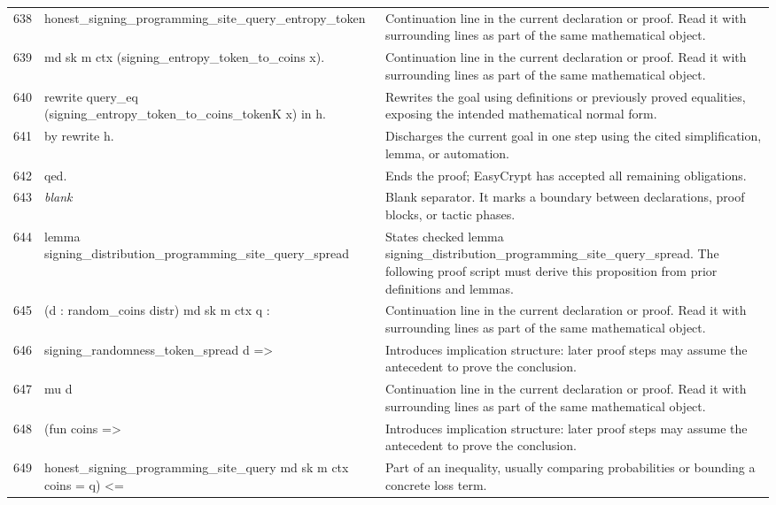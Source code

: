 \documentclass[10pt]{article}
\begin{document}
\begin{longtable}{r L{0.53\textwidth} L{0.37\textwidth}}
638 & {\ttfamily\scriptsize   honest\_signing\_programming\_site\_query\_entropy\_token} & Continuation line in the current declaration or proof.  Read it with surrounding lines as part of the same mathematical object. \\
639 & {\ttfamily\scriptsize     md sk m ctx (signing\_entropy\_token\_to\_coins x).} & Continuation line in the current declaration or proof.  Read it with surrounding lines as part of the same mathematical object. \\
640 & {\ttfamily\scriptsize rewrite query\_eq (signing\_entropy\_token\_to\_coins\_tokenK x) in h.} & Rewrites the goal using definitions or previously proved equalities, exposing the intended mathematical normal form. \\
641 & {\ttfamily\scriptsize by rewrite h.} & Discharges the current goal in one step using the cited simplification, lemma, or automation. \\
642 & {\ttfamily\scriptsize qed.} & Ends the proof; EasyCrypt has accepted all remaining obligations. \\
643 & {\ttfamily\scriptsize \emph{blank}} & Blank separator.  It marks a boundary between declarations, proof blocks, or tactic phases. \\
644 & {\ttfamily\scriptsize lemma signing\_distribution\_programming\_site\_query\_spread} & States checked lemma signing\_distribution\_programming\_site\_query\_spread.  The following proof script must derive this proposition from prior definitions and lemmas. \\
645 & {\ttfamily\scriptsize   (d : random\_coins distr) md sk m ctx q :} & Continuation line in the current declaration or proof.  Read it with surrounding lines as part of the same mathematical object. \\
646 & {\ttfamily\scriptsize   signing\_randomness\_token\_spread d =>} & Introduces implication structure: later proof steps may assume the antecedent to prove the conclusion. \\
647 & {\ttfamily\scriptsize   mu d} & Continuation line in the current declaration or proof.  Read it with surrounding lines as part of the same mathematical object. \\
648 & {\ttfamily\scriptsize     (fun coins =>} & Introduces implication structure: later proof steps may assume the antecedent to prove the conclusion. \\
649 & {\ttfamily\scriptsize       honest\_signing\_programming\_site\_query md sk m ctx coins = q) <=} & Part of an inequality, usually comparing probabilities or bounding a concrete loss term. \\

\end{longtable}
\end{document}
